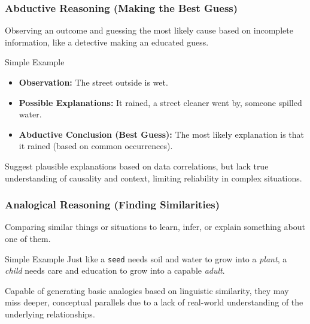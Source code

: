 \begin{frame}
\frametitle{Abductive Reasoning (Making the Best Guess)}

Observing an outcome and guessing the most likely cause based on incomplete information, like a detective making an educated guess.

\bigskip

\begin{block}{Simple Example}
  \begin{itemize}
    \item \textbf{Observation:} The street outside is wet.
    \item \textbf{Possible Explanations:} It rained, a street cleaner went by, someone spilled water.
    \item \textbf{Abductive Conclusion (Best Guess):} The most likely explanation is that it rained (based on common occurrences).
  \end{itemize}
\end{block}

\bigskip

 Suggest plausible explanations based on data correlations, but lack true understanding of causality and context, limiting reliability in complex situations.
\end{frame}

\begin{frame}
\frametitle{Analogical Reasoning (Finding Similarities)}

Comparing similar things or situations to learn, infer, or explain something about one of them.

\bigskip

\begin{block}{Simple Example}
  Just like a \texttt{seed} needs soil and water to grow into a \textit{plant}, a \textit{child} needs care and education to grow into a capable \textit{adult}.
\end{block}

\bigskip

Capable of generating basic analogies based on linguistic similarity, they may miss deeper, conceptual parallels due to a lack of real-world understanding of the underlying relationships.
\end{frame}


